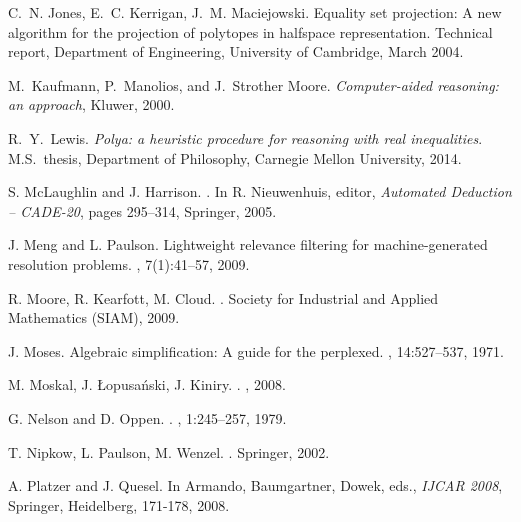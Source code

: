 \documentclass[runningheds]{llncs}
\begin{document}
\begin{thebibliography}{10}
C.~N. Jones, E.~C. Kerrigan,  J.~M. Maciejowski.
\newblock Equality set projection: A new algorithm for the projection of
  polytopes in halfspace representation.
\newblock Technical report, Department of Engineering, University of Cambridge,
  March 2004.
  
M.~Kaufmann, P.~Manolios, and J.~Strother Moore.
\newblock \emph{Computer-aided reasoning: an approach}, Kluwer, 2000.

R.~Y.~Lewis.
\newblock \emph{Polya: a heuristic procedure for reasoning with real inequalities}.
\newblock M.S.~thesis, Department of Philosophy, Carnegie Mellon University, 2014.

S. McLaughlin and J. Harrison.
.
\newblock In R. Nieuwenhuis, editor, {\em {Automated Deduction -- CADE-20}}, pages 295--314, Springer, 2005.


J. Meng and L. Paulson.
\newblock Lightweight relevance filtering for machine-generated resolution
  problems.
, 7(1):41--57, 2009.

R. Moore, R. Kearfott,  M. Cloud.
.
\newblock Society for Industrial and Applied Mathematics (SIAM), 2009.


J. Moses.
\newblock Algebraic simplification: A guide for the perplexed.
, 14:527--537, 1971.

M. Moskal, J. {\L}opusa\'nski, J. Kiniry.
.
, 2008.

G. Nelson and D. Oppen.
.
,
  1:245--257, 1979.

T. Nipkow, L. Paulson,  M. Wenzel.
.
\newblock Springer, 2002.

A. Platzer and J. Quesel.
\newblock In Armando, Baumgartner, Dowek, eds., {\em IJCAR 2008}, Springer,
  Heidelberg, 171-178, 2008. 
  

\end{thebibliography}
\end{document}
